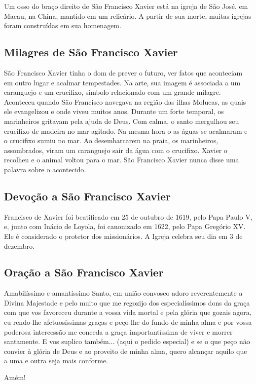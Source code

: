 \documentclass[11pt]{article}
\begin{document}
\begin{justify}
Um osso do braço direito de São Francisco Xavier está na igreja de São José, em Macau, na China, mantido em um relicário. A partir de sua morte, muitas igrejas foram construídas em sua homenagem.

\subsection{Milagres de São Francisco Xavier}

São Francisco Xavier tinha o dom de prever o futuro, ver fatos que aconteciam em outro lugar e acalmar tempestades. Na arte, sua imagem é associada a um caranguejo e um crucifixo, símbolo relacionado com um grande milagre. Aconteceu quando São Francisco navegava na região das ilhas Molucas, as quais ele evangelizou e onde viveu muitos anos. Durante um forte temporal, os marinheiros gritavam pela ajuda de Deus. Com calma, o santo mergulhou seu crucifixo de madeira no mar agitado. Na mesma hora o as águas se acalmaram e o crucifixo sumiu no mar. Ao desembarcarem na praia, os marinheiros, assombrados, viram um caranguejo sair da água com o crucifixo. Xavier o recolheu e o animal voltou para o mar. São Francisco Xavier nunca disse uma palavra sobre o acontecido.
\subsection{Devoção a São Francisco Xavier}

Francisco de Xavier foi beatificado em 25 de outubro de 1619, pelo Papa Paulo V, e, junto com Inácio de Loyola, foi canonizado em 1622, pelo Papa Gregório XV. Ele é considerado o protetor dos missionários. A Igreja celebra seu dia em 3 de dezembro.
\subsection{Oração a São Francisco Xavier}

Amabilíssimo e amantíssimo Santo, em união convosco adoro reverentemente a Divina Majestade e pelo muito que me regozijo dos especialíssimos dons da graça com que vos favoreceu durante a vossa vida mortal e pela glória que gozais agora, eu rendo-lhe afetuosíssimas graças e peço-lhe do fundo de minha alma e por vossa poderosa intercessão me conceda a graça importantíssima de viver e morrer santamente. E vos suplico também... (aqui o pedido especial) e se o que peço não convier à glória de Deus e ao proveito de minha alma, quero alcançar aquilo que a uma e outra seja mais conforme.

\end{justify}
Amém!
\end{document}
